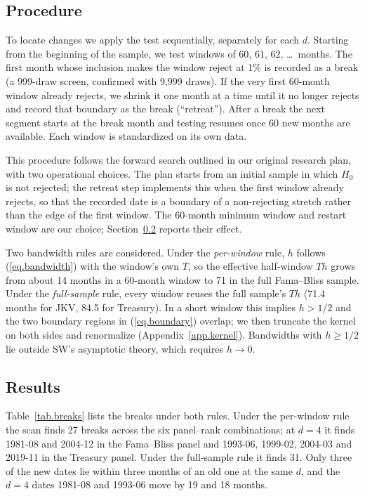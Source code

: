 \documentclass[11pt]{article}
\begin{document}
\subsection{Procedure}

To locate changes we apply the test sequentially, separately for each $d$. Starting from the beginning of the sample, we test windows of 60, 61, 62, \ldots\ months. The first month whose inclusion makes the window reject at 1\% is recorded as a break (a 999-draw screen, confirmed with 9,999 draws). If the very first 60-month window already rejects, we shrink it one month at a time until it no longer rejects and record that boundary as the break (``retreat''). After a break the next segment starts at the break month and testing resumes once 60 new months are available. Each window is standardized on its own data.

This procedure follows the forward search outlined in our original research plan, with two operational choices. The plan starts from an initial sample in which $H_0$ is not rejected; the retreat step implements this when the first window already rejects, so that the recorded date is a boundary of a non-rejecting stretch rather than the edge of the first window. The 60-month minimum window and restart window are our choice; Section~\ref{sec.scanres} reports their effect.

Two bandwidth rules are considered. Under the \emph{per-window} rule, $h$ follows (\ref{eq.bandwidth}) with the window's own $T$, so the effective half-window $Th$ grows from about 14 months in a 60-month window to 71 in the full Fama--Bliss sample. Under the \emph{full-sample} rule, every window reuses the full sample's $Th$ (71.4 months for JKV, 84.5 for Treasury). In a short window this implies $h>1/2$ and the two boundary regions in (\ref{eq.boundary}) overlap; we then truncate the kernel on both sides and renormalize (Appendix~\ref{app.kernel}). Bandwidths with $h\ge 1/2$ lie outside SW's asymptotic theory, which requires $h\to 0$.

\subsection{Results}\label{sec.scanres}

Table~\ref{tab.breaks} lists the breaks under both rules. Under the per-window rule the scan finds 27 breaks across the six panel--rank combinations; at $d=4$ it finds 1981-08 and 2004-12 in the Fama--Bliss panel and 1993-06, 1999-02, 2004-03 and 2019-11 in the Treasury panel. Under the full-sample rule it finds 31. Only three of the new dates lie within three months of an old one at the same $d$, and the $d=4$ dates 1981-08 and 1993-06 move by 19 and 18 months.
\end{document}
